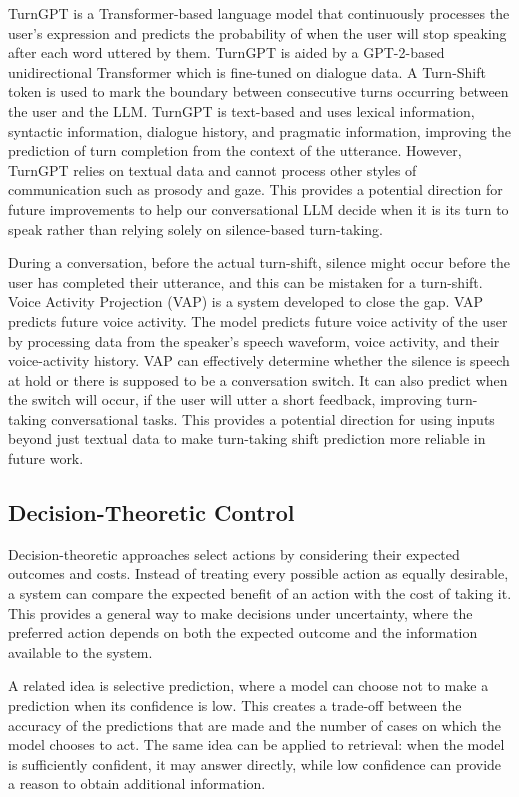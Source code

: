 TurnGPT is a Transformer-based language model that continuously processes the user's expression and predicts the probability of when the user will stop speaking after each word uttered by them. TurnGPT is aided by a GPT-2-based unidirectional Transformer which is fine-tuned on dialogue data. A Turn-Shift token is used to mark the boundary between consecutive turns occurring between the user and the LLM. TurnGPT is text-based and uses lexical information, syntactic information, dialogue history, and pragmatic information, improving the prediction of turn completion from the context of the utterance. However, TurnGPT relies on textual data and cannot process other styles of communication such as prosody and gaze. This provides a potential direction for future improvements to help our conversational LLM decide when it is its turn to speak rather than relying solely on silence-based turn-taking. \cite{ekstedt2020turngpt}

During a conversation, before the actual turn-shift, silence might occur before the user has completed their utterance, and this can be mistaken for a turn-shift. Voice Activity Projection (VAP) is a system developed to close the gap. VAP predicts future voice activity. The model predicts future voice activity of the user by processing data from the speaker's speech waveform, voice activity, and their voice-activity history. VAP can effectively determine whether the silence is speech at hold or there is supposed to be a conversation switch. It can also predict when the switch will occur, if the user will utter a short feedback, improving turn-taking conversational tasks. This provides a potential direction for using inputs beyond just textual data to make turn-taking shift prediction more reliable in future work. \cite{ekstedt2022vap}


\subsection{Decision-Theoretic Control}

Decision-theoretic approaches select actions by considering their expected outcomes and costs. Instead of treating every possible action as equally desirable, a system can compare the expected benefit of an action with the cost of taking it. This provides a general way to make decisions under uncertainty, where the preferred action depends on both the expected outcome and the information available to the system.

A related idea is selective prediction, where a model can choose not to make a prediction when its confidence is low. This creates a trade-off between the accuracy of the predictions that are made and the number of cases on which the model chooses to act. The same idea can be applied to retrieval: when the model is sufficiently confident, it may answer directly, while low confidence can provide a reason to obtain additional information.

